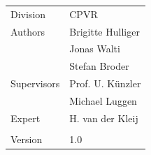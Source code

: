 \begin{titlepage}
\begin{flushleft}
\begin{tabular}{p{5cm}p{8cm}}
\Large{Division} & \Large{CPVR}\\[0.2cm]
\Large{Authors} & \Large{Brigitte Hulliger}\\[0.2cm]
& \Large{Jonas Walti}\\[0.2cm]
& \Large{Stefan Broder}\\[0.2cm]
\Large{Supervisors} & \Large{Prof. U. K\"unzler} \\[0.2cm]
& \Large{Michael Luggen }\\[0.2cm]
\Large{Expert} & \Large{H. van der Kleij}\\[0.2cm]
& \\[0.2cm]
\Large{Version} & \Large{1.0}
\end{tabular} 

 \end{flushleft}
\end{titlepage}
